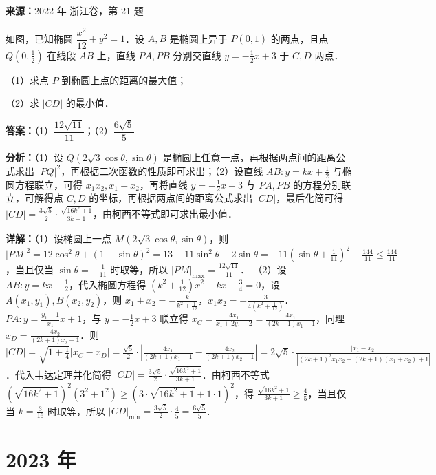 \begin{question}[points=15]
\textbf{来源：}2022 年 浙江卷，第 21 题\par
如图，已知椭圆 $\dfrac{x^2}{12} + y^2 = 1$．设 $A,B$ 是椭圆上异于 $P(0,1)$ 的两点，且点 $Q\left(0,\frac{1}{2}\right)$ 在线段 $AB$ 上，直线 $PA, PB$ 分别交直线 $y = -\frac{1}{2}x + 3$ 于 $C, D$ 两点．

（1）求点 $P$ 到椭圆上点的距离的最大值；

（2）求 $|CD|$ 的最小值．
\begin{solution}
\textbf{答案：}（1）$\dfrac{12\sqrt{11}}{11}$；（2）$\dfrac{6\sqrt{5}}{5}$

\textbf{分析：}（1）设 $Q(2\sqrt{3}\cos\theta, \sin\theta)$ 是椭圆上任意一点，再根据两点间的距离公式求出 $|PQ|^2$，再根据二次函数的性质即可求出；（2）设直线 $AB: y=kx+\frac{1}{2}$ 与椭圆方程联立，可得 $x_1x_2, x_1+x_2$，再将直线 $y=-\frac{1}{2}x+3$ 与 $PA, PB$ 的方程分别联立，可解得点 $C,D$ 的坐标，再根据两点间的距离公式求出 $|CD|$，最后化简可得 $|CD| = \frac{3\sqrt{5}}{2}\cdot\frac{\sqrt{16k^2+1}}{3k+1}$，由柯西不等式即可求出最小值．

\textbf{详解：}（1）设椭圆上一点 $M(2\sqrt{3}\cos\theta,\sin\theta)$，则 $|PM|^2 = 12\cos^2\theta + (1-\sin\theta)^2 = 13 - 11\sin^2\theta - 2\sin\theta = -11\left(\sin\theta+\frac{1}{11}\right)^2 + \frac{144}{11} \le \frac{144}{11}$，当且仅当 $\sin\theta = -\frac{1}{11}$ 时取等，所以 $|PM|_{\max} = \frac{12\sqrt{11}}{11}$．
（2）设 $AB: y = kx + \frac{1}{2}$，代入椭圆方程得 $(k^2+\frac{1}{12})x^2 + kx - \frac{3}{4}=0$，设 $A(x_1,y_1), B(x_2,y_2)$，则 $x_1+x_2 = -\frac{k}{k^2+\frac{1}{12}}$，$x_1x_2 = -\frac{3}{4(k^2+\frac{1}{12})}$．$PA: y = \frac{y_1-1}{x_1}x+1$，与 $y=-\frac{1}{2}x+3$ 联立得 $x_C = \frac{4x_1}{x_1+2y_1-2} = \frac{4x_1}{(2k+1)x_1-1}$，同理 $x_D = \frac{4x_2}{(2k+1)x_2-1}$．则 $|CD| = \sqrt{1+\frac{1}{4}}|x_C-x_D| = \frac{\sqrt{5}}{2}\cdot\left|\frac{4x_1}{(2k+1)x_1-1} - \frac{4x_2}{(2k+1)x_2-1}\right| = 2\sqrt{5}\cdot\frac{|x_1-x_2|}{|(2k+1)^2 x_1x_2 - (2k+1)(x_1+x_2)+1|}$．代入韦达定理并化简得 $|CD| = \frac{3\sqrt{5}}{2}\cdot\frac{\sqrt{16k^2+1}}{3k+1}$．由柯西不等式 $(\sqrt{16k^2+1})^2(3^2+1^2) \ge (3\cdot\sqrt{16k^2+1}+1\cdot1)^2$，得 $\frac{\sqrt{16k^2+1}}{3k+1} \ge \frac{4}{5}$，当且仅当 $k=\frac{3}{16}$ 时取等，所以 $|CD|_{\min} = \frac{3\sqrt{5}}{2}\cdot\frac{4}{5} = \frac{6\sqrt{5}}{5}$.
\end{solution}
\end{question}

\section*{2023 年}

